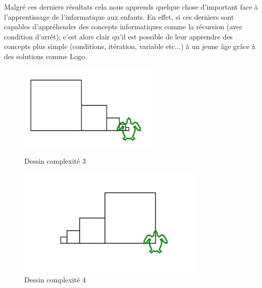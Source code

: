 Malgré ces derniers résultats cela nous apprends quelque chose d'important face à l'apprentissage de l'informatique aux enfants. En effet, si ces derniers sont capables d'appréhender des concepts informatiques comme la récursion (avec condition d'arrêt), c'est alors clair qu'il est possible de leur apprendre des concepts plus simple (conditions, itération, variable etc...) à un jeune âge grâce à des solutions comme Logo.

\begin{figure}[!htb]
  \centering
  \begin{minipage}[b]{0.45\textwidth}
    \includegraphics[width=\textwidth]{images/logo5.png}
    \caption{Dessin complexité 3}
  \end{minipage}
  \hfill
  \begin{minipage}[b]{0.45\textwidth}
    \includegraphics[width=\textwidth]{images/logo4.png}
    \caption{Dessin complexité 4}
  \end{minipage}
\end{figure}

